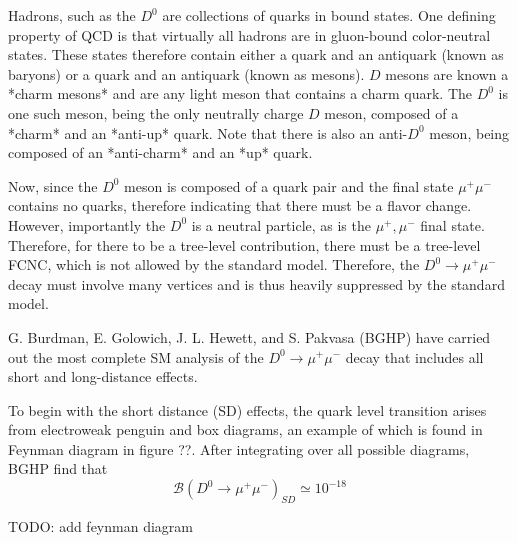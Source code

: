 Hadrons, such as the $D^0$ are collections of quarks in bound states. One defining property of QCD is that virtually all hadrons are in gluon-bound color-neutral states. These states therefore contain either a quark and an antiquark (known as baryons) or a quark and an antiquark (known as mesons). $D$ mesons are known a *charm mesons* and are any light meson that contains a charm quark. The $D^0$ is one such meson, being the only neutrally charge $D$ meson, composed of a *charm* and an *anti-up* quark. Note that there is also an anti-$D^0$ meson, being composed of an *anti-charm* and an *up* quark. 

Now, since the $D^0$ meson is composed of a quark pair and the final state $\mu^+ \mu^-$ contains no quarks, therefore indicating that there must be a flavor change. However, importantly the $D^0$ is a neutral particle, as is the $\mu^+, \mu^-$ final state. Therefore, for there to be a tree-level contribution, there must be a tree-level FCNC, which is not allowed by the standard model. Therefore, the $D^0 \to \mu^+ \mu^-$  decay must involve many vertices and is thus heavily suppressed by the standard model.

G. Burdman, E. Golowich, J. L. Hewett, and S. Pakvasa (BGHP) have carried out the most complete SM analysis of the $D^0 \to \mu^+ \mu^-$ decay that includes all short and long-distance effects. 

To begin with the short distance (SD) effects, the quark level transition arises from electroweak penguin and box diagrams, an example of which is found in Feynman diagram in figure ??. After integrating over all possible diagrams, BGHP find that 
\begin{equation}
\mathcal{B}(D^0 \to \mu^+ \mu^-)_{SD} \simeq 10^{-18}
\end{equation}

TODO: add feynman diagram

